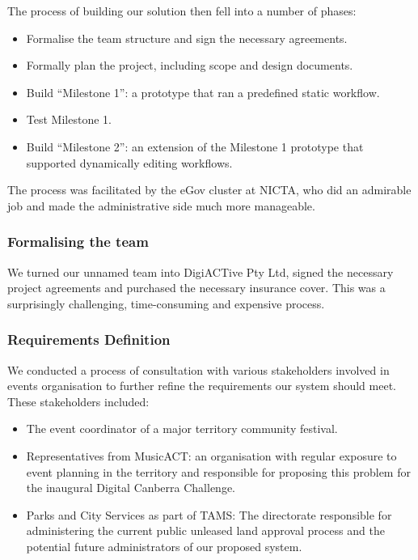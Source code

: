 \documentclass[12pt,a4paper,twosided]{article}
\begin{document}
The process of building our solution then fell into a
number of phases:

\begin{itemize}

\item
  Formalise the team structure and sign the necessary agreements.
\item
  Formally plan the project, including scope and design documents.
\item
  Build ``Milestone 1'': a prototype that ran a predefined static
  workflow.
\item
  Test Milestone 1.
\item
  Build ``Milestone 2'': an extension of the Milestone 1 prototype that
  supported dynamically editing workflows.
\end{itemize}

The process was facilitated by the eGov cluster at NICTA, who did an
admirable job and made the administrative side much more manageable.

\subsubsection{Formalising the team}

We turned our unnamed team into DigiACTive Pty Ltd, signed the
necessary project agreements and purchased the necessary insurance
cover. This was a surprisingly challenging, time-consuming and expensive
process.

\subsubsection{Requirements Definition}

We conducted a process of consultation with various stakeholders involved
in events organisation to further refine the requirements our system should 
meet. These stakeholders included:

\begin{itemize}

\item
  The event coordinator of a major territory community festival.
\item
  Representatives from MusicACT: an organisation with regular exposure 
  to event planning in the territory and responsible for proposing 
  this problem for the inaugural Digital Canberra Challenge.
\item
  Parks and City Services as part of TAMS: The directorate responsible for
  administering the current public unleased land approval process and the
  potential future administrators of our proposed system.
\end{itemize}
\end{document}
